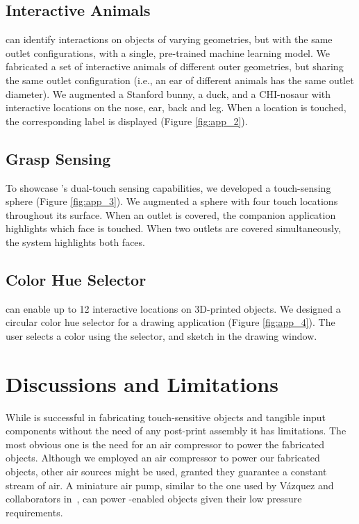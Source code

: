 		\subsection*{Interactive Animals}
			\at can identify interactions on objects of varying geometries, but with
			the same outlet configurations, with a single, pre-trained machine
			learning model. We fabricated a set of interactive animals of different
			outer geometries, but sharing the same outlet configuration (i.e., an
			ear of different animals has the same outlet diameter). We augmented a
			Stanford bunny, a duck, and a CHI-nosaur with interactive locations on
			the nose, ear, back and leg. When a location is touched, the
			corresponding label is displayed (Figure \ref{fig:app_2}).
		    
		\subsection*{Grasp Sensing}
			To showcase \at's dual-touch sensing capabilities, we developed a
			touch-sensing sphere (Figure \ref{fig:app_3}). We augmented a sphere with
			four touch locations throughout its surface. When an outlet is covered,
			the companion application highlights which face is touched. When two
			outlets are covered simultaneously, the system highlights both faces.
		    
		\subsection*{Color Hue Selector}
			\at can enable up to 12 interactive locations on 3D-printed objects. We
			designed a circular color hue selector for a drawing application (Figure
			\ref{fig:app_4}). The user selects a color using the selector, and sketch
			in the drawing window.
		    
	\section{Discussions and Limitations}
		While \at is successful in fabricating touch-sensitive objects and tangible
		input components without the need of any post-print assembly it has
		limitations. The most obvious one is the need for an air compressor to power
		the fabricated objects. Although we employed an air compressor to power our
		fabricated objects, other air sources might be used, granted they guarantee
		a constant stream of air. A miniature air pump, similar to the one used by
		V\'azquez and collaborators in~\cite{Vazquez:2015}, can power \at-enabled
		objects given their low pressure requirements.
		
